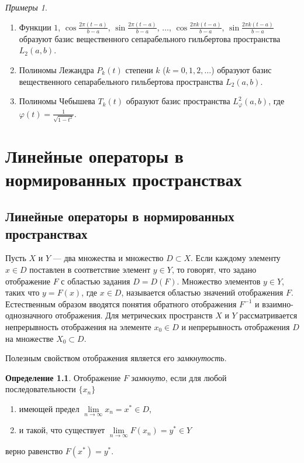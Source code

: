 \documentclass[12pt,a4paper,titlepage,oneside]{book}
\theoremstyle{definition}
\newtheorem*{definition}{Определение}
\theoremstyle{plain}
\theoremstyle{break}
\theoremstyle{remark}
\theoremstyle{remark}
\theoremstyle{remark}
\newtheorem*{examples}{Примеры}
\theoremstyle{remark}
\theoremstyle{plain}
\theoremstyle{plain}
\begin{document}
\begin{examples}
\leavevmode
\begin{enumerate}
	\item Функции $1$, $\cos \frac{2 \pi (t - a)}{b - a}$, $\sin \frac{2 \pi (t - a)}{b - a}$, $\ldots$, $\cos \frac{2 \pi k (t - a)}{b - a}$, $\sin \frac{2 \pi k (t - a)}{b - a}$ образуют базис вещественного сепарабельного гильбертова пространства $L_2(a, b)$.
	
	\item Полиномы Лежандра $P_k(t)$ степени $k$ ($k = 0, 1, 2, \ldots$) образуют базис вещественного сепарабельного гильбертова пространства $L_2(a, b)$.
	
	\item Полиномы Чебышева $T_k(t)$ образуют базис пространства $L_{\varphi}^2 (a, b)$, где $\varphi(t) = \frac{1}{\sqrt{1 - t^2}}$.
\end{enumerate}
\end{examples}

\chapter{Линейные операторы в нормированных пространствах}

\section{Линейные операторы в нормированных пространствах}
Пусть $X$ и $Y$ --- два множества и множество $D \subset X$. Если каждому элементу $x \in D$ поставлен в соответствие элемент $y \in Y$, то говорят, что задано отображение $F$ с областью задания $D=D(F)$. Множество элементов $y \in Y$, таких что $y=F(x)$, где $x \in D$, называется областью значений отображения $F$. Естественным образом вводятся понятия обратного отображения ${F}^{-1}$ и взаимно-однозначного отображения. Для метрических пространств $X$ и $Y$ рассматривается непрерывность отображения на элементе $x_0 \in D$ и непрерывность отображения $D$ на множестве $X_0 \subset D$.

Полезным свойством отображения является его \textit{замкнутость}.

\begin{definition} Отображение $F$ \textit{замкнуто}, если для любой последовательности  $\lbrace x_n \rbrace$

\begin{enumerate}

 \item имеющей предел $\lim \limits_{n \to \infty} x_n= x^* \in D$,
 
 \item и такой, что существует $\lim \limits_{n \to \infty} F(x_n)= y^* \in Y$
 
\end{enumerate} 
 
верно равенство $F(x^*)=y^*$.

\end{definition}
\end{document}
